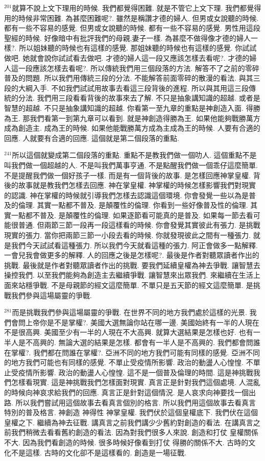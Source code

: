 \documentclass{book}
\begin{document}
$^{201}$就算不說上文下理用的時候.
我們都覺得困難.
就是不管它上文下理.
我們都覺得用的時候非常困難.
為甚麼困難呢?.
雖然是稱讚才德的婦人.
但男或女說聽的時候.
都有一些不容易的感覺.
但男或女說聽的時候.
都有一些不容易的感覺.
男性用這段聖經的時候.
好像暗中有批評我們的母親,妻子一樣.
為甚麼不做得像才德的婦人一樣?.
所以姐妹聽的時候也有這樣的感覺.
那姐妹聽的時候也有這樣的感覺.
你試試做吧.
她就會說你試試看去做吧.
才德的婦人這一段又應該怎樣去看呢?.
才德的婦人這一段應該怎樣去看呢?.
所以傳統我們用三個段落的方法.
解答不了之前的零碎普及的問題.
所以我們用傳統三段的分法.
不能解答前面零碎的散漫的看法.
與其三段的大綱入手.
不如我們試試用故事去看這三段背後的進程.
所以與其用這三段傳統的分法.
我們用三段看看背後的故事來去了解.
不只是抽象講知識的超越.
或者是智慧的超越.
不只是抽象講知識的超越.
你看第一至九章的重點是神創造入面.
得勝為王.
那我們看第一到第九章可以看到.
就是神創造得勝為王.
如果他能夠戰勝萬方成為創造主.
成為王的時候.
如果他能戰勝萬方成為主成為王的時候.
人要有合適的回應.
人就要有合適的回應.
這個就是第二個段落的重點.

$^{241}$所以這個就變成第二個段落的重點.
重點不是教我們做一個叻人.
這個重點不是叫我們做一個超越的人.
不是叫我們萬事亨通.
不是點醒我們做一個乖仔這麼簡單.
不是提醒我們做一個好孩子一樣.
而是有一個背後的故事.
是怎樣回應神掌皇權.
背後的故事就是教我們怎樣去回應.
神在掌皇權.
神掌權的時候怎樣影響我們對現實的認識.
神在掌權的時候就引導我們怎樣去認識這個環境.
你會發覺一些以為是普及的倫理.
其實一點都不普及.
是顛覆性的倫理.
你看到一些好像普及性的倫理.
其實一點都不普及.
是顛覆性的倫理.
如果逐節看可能真的是普及.
如果每一節去看可能很普通.
但兩節三節一段再一段這樣看的時候.
你會發覺其實彼此有張力.
是挑戰現實的張力.
當你把兩節三節一小段去看的時候.
你就發現彼此之間有一種張力.
就是我們今天試試看這種張力.
所以我們今天就看這種的張力.
阿正會做多一點解釋.
一會兒我會做更多的解釋.
人的回應之後是怎樣呢?.
最後是作者對聽眾讀者作出的挑戰.
最後就是作者對聽眾讀者作出的挑戰.
要我們延續皇權為神去爭戰.
讓智慧去操控我們.
以至我們能夠為創造主去繼續爭戰.
讓智慧來出眾我們.
來繼續在生活上面來站穩爭戰.
不是母親節的經文這麼簡單.
不單只是五天節的經文這麼簡單.
是挑戰我們參與這場屬靈的爭戰.

$^{281}$而是挑戰我們參與這場屬靈的爭戰.
在世界不同的地方我們處於這樣的光景.
我們會問上帝你是不是掌權?.
美國大選無論你站在哪一邊.
美國始終有一半的人現在不是很高興.
美國至少有一半的人現在不大高興.
就算大選結果是怎樣也好.
也有一半人是不高興的.
無論大選的結果是怎樣.
都會有一半人是不高興的.
我們都會問誰在掌權?.
我們都在問誰在掌權?.
亞洲不同的地方我們可能有同樣的感覺.
亞洲不同的地方我們可能也有同樣的感覺.
不單止受疫情所影響.
政治的動盪人心惶惶.
不單止受疫情所影響.
政治的動盪人心惶惶.
這不是一個普及倫理的時間.
這是神挑戰我們怎樣看現實.
這是神挑戰我們怎樣面對現實.
真言正是針對我們這個處境.
人混亂的時候向神哀求給我們的回應.
真言正是針對這個情況.
是人哀求向神要找一個出路.
所以我們嘗試用這個故事去看真言個別的格言.
所以我們用這個故事去看真言特別的普及格言.
神創造 神得性 神掌皇權.
我們伏於這個皇權底下.
我們伏在這個皇權之下.
繼續為神去征戰.
講真言之前我們講少少舊約對創造的看法.
在講真言之前我們稍微去看看舊約創造的看法.
因為對我們很多人來說.
創造和打仗 皇權關係不大.
因為我們看創造的時候.
很多時候好像看到打仗 得勝的關係不大.
古時的文化不是這樣.
古時的文化卻不是這樣看的.
創造是一場征戰.
\end{document}
